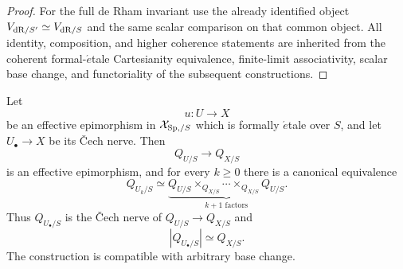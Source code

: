 \begin{proof}
For the full de Rham invariant use the already identified object
\(V_{\mathrm{dR}/S'}\simeq V_{\mathrm{dR}/S}\) and the same scalar comparison on that common
object.  All identity, composition, and higher coherence statements are
inherited from the coherent formal-\(\acute{e}\)tale Cartesianity equivalence,
finite-limit associativity, scalar base change, and functoriality of the
subsequent constructions.
\end{proof}

\begin{theorem}
\label{thm:effective-quotient-formal-etale-descent}
Let
\[
    u:U\longrightarrow X
\]
be an effective epimorphism in \(\mathcal X_{\mathrm{Sp},/S}\) which is formally \(\acute{e}\)tale over
\(S\), and let \(U_\bullet\to X\) be its \v{C}ech nerve.  Then
\[
\boxed{
    Q_{U/S}\longrightarrow Q_{X/S}
}
\]
is an effective epimorphism, and for every \(k\geq0\) there is a canonical equivalence
\[
\boxed{
    Q_{U_k/S}
    \simeq
    \underbrace{
        Q_{U/S}\times_{Q_{X/S}}\cdots\times_{Q_{X/S}}Q_{U/S}
    }_{k+1\text{ factors}}.
}
\]
Thus \(Q_{U_\bullet/S}\) is the \v{C}ech nerve of \(Q_{U/S}\to Q_{X/S}\) and
\[
    |Q_{U_\bullet/S}|\simeq Q_{X/S}.
\]
The construction is compatible with arbitrary base change.
\end{theorem}

